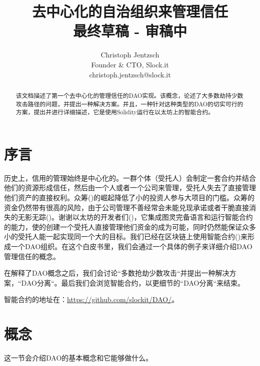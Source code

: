 \documentclass[9pt,oneside]{amsart}
\title{去中心化的自治组织来管理信任\\ {\smaller \textbf{最终草稿 - 审稿中}}}
\author{
    Christoph Jentzsch\\
    Founder \& CTO, Slock.it\\
    christoph.jentzsch@slock.it
}
\begin{document}
\begin{abstract}
该文档描述了第一个去中心化的管理信任的DAO实现。该概念，论述了大多数劫持少数攻击路径的问题，并提出一种解决方案。并且，一种针对这种类型的DAO的切实可行的方案，提出并进行详细描述，它是使用Solidity运行在以太坊上的智能合约。
\end{abstract}

\maketitle
\setlength{\columnsep}{20pt}
\begin{multicols}{2}

\section{序言}\label{sec:introduction}

历史上，信用的管理始终是中心化的。一群个体（受托人）会制定一套合约并结合他们的资源形成信任，然后由一个人或者一个公司来管理，受托人失去了直接管理他们资产的直接权利。众筹(\cite{2015CFReport})的崛起降低了小的投资人参与大项目的门槛。众筹的资金仍然带有很高的风险，由于公司管理不善经常会未能兑现承诺或者干脆直接消失的无影无踪(\cite{9MostDisgracefulCrowdFundings, CrowdfundingFailTC})。谢谢以太坊的开发者们(\cite{buterin2013ethereum,Wood2014ethereum})，它集成图灵完备语言和运行智能合约的能力，使的创建一个受托人直接管理他们资金的成为可能，同时仍然能保证众多小的受托人能一起实现同一个大的目标。我们已经在区块链上使用智能合约(\cite{szabo1997formalizing, miller1997future})来形成一个DAO组织。在这个白皮书里，我们会通过一个具体的例子来详细介绍DAO管理信任的概念。

在解释了DAO概念之后，我们会讨论``多数抢劫少数攻击``并提出一种解决方案，``DAO分离``。最后我们会浏览智能合约，以更细节的``DAO分离``来结束。

智能合约的地址在：\url{https://github.com/slockit/DAO/}。

\section{概念}

这一节会介绍DAO的基本概念和它能够做什么。


\end{multicols}
\end{document}

